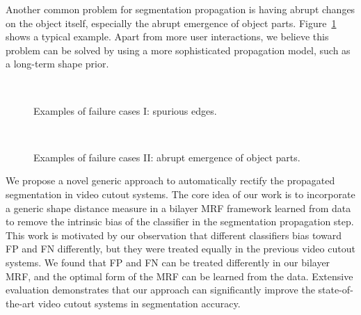 \documentclass[10pt,journal,compsoc]{newIEEEtran}
\begin{document}
Another common problem for segmentation propagation is having abrupt changes on the object itself, especially the abrupt emergence of object parts. Figure~\ref{FIG:SuddenParts} shows a typical example. Apart from more user interactions, we believe this problem can be solved by using a more sophisticated propagation model, such as a long-term shape prior.


\begin{figure}[!h]
	\centering
	\\\vspace{-2mm}
	\caption{Examples of failure cases I: spurious edges.}\label{FIG:SpuriousEdge}\vspace{-3mm}
	\centering
	\\\vspace{-2mm}
	\caption{Examples of failure cases II: abrupt emergence of object parts.}\label{FIG:SuddenParts}
\end{figure}%
We propose a novel generic approach to automatically rectify the propagated segmentation in video cutout systems. The core idea of our work is to incorporate a generic shape distance measure in a bilayer MRF framework learned from data to remove the intrinsic bias of the classifier in the segmentation propagation step. This work is motivated by our observation that different classifiers bias toward FP and FN differently, but they were treated equally in the previous video cutout systems. We found that FP and FN can be treated differently in our bilayer MRF, and the optimal form of the MRF can be learned from the data. Extensive evaluation demonstrates that our approach can significantly improve the state-of-the-art video cutout systems in segmentation accuracy.
\end{document}

